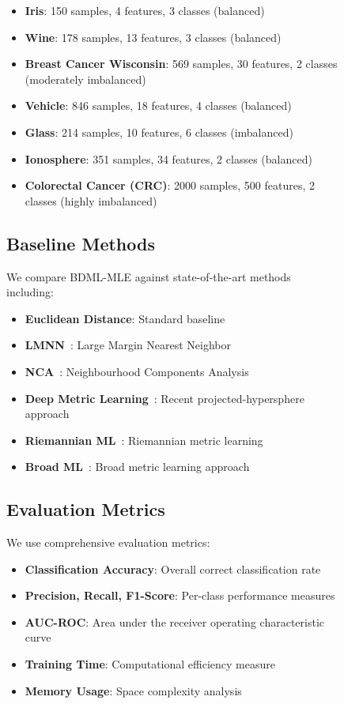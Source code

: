 \documentclass[review]{elsarticle}
\begin{document}
\begin{figure}[htbp]
\begin{itemize}
\item \textbf{Iris}: 150 samples, 4 features, 3 classes (balanced)
\item \textbf{Wine}: 178 samples, 13 features, 3 classes (balanced)  
\item \textbf{Breast Cancer Wisconsin}: 569 samples, 30 features, 2 classes (moderately imbalanced)
\item \textbf{Vehicle}: 846 samples, 18 features, 4 classes (balanced)
\item \textbf{Glass}: 214 samples, 10 features, 6 classes (imbalanced)
\item \textbf{Ionosphere}: 351 samples, 34 features, 2 classes (balanced)
\item \textbf{Colorectal Cancer (CRC)}: 2000 samples, 500 features, 2 classes (highly imbalanced)
\end{itemize}

\subsection{Baseline Methods}

We compare BDML-MLE against state-of-the-art methods including:

\begin{itemize}
\item \textbf{Euclidean Distance}: Standard baseline
\item \textbf{LMNN}~\cite{weinberger2009distance}: Large Margin Nearest Neighbor
\item \textbf{NCA}~\cite{goldberger2005neighbourhood}: Neighbourhood Components Analysis
\item \textbf{Deep Metric Learning}~\cite{xu2025deep}: Recent projected-hypersphere approach
\item \textbf{Riemannian ML}~\cite{gruffaz2025riemannian}: Riemannian metric learning
\item \textbf{Broad ML}~\cite{hu2025broad}: Broad metric learning approach
\end{itemize}

\subsection{Evaluation Metrics}

We use comprehensive evaluation metrics:

\begin{itemize}
\item \textbf{Classification Accuracy}: Overall correct classification rate
\item \textbf{Precision, Recall, F1-Score}: Per-class performance measures
\item \textbf{AUC-ROC}: Area under the receiver operating characteristic curve
\item \textbf{Training Time}: Computational efficiency measure
\item \textbf{Memory Usage}: Space complexity analysis
\end{itemize}


\end{figure}
\end{document}

